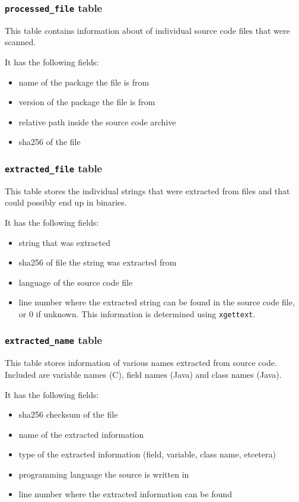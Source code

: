 \documentclass[10pt]{article}
\begin{document}
\subsubsection{\texttt{processed\_file} table}
This table contains information about of individual source code files that were
scanned.

It has the following fields:

\begin{itemize}
\item name of the package the file is from
\item version of the package the file is from
\item relative path inside the source code archive
\item sha256 of the file
\end{itemize}

\subsubsection{\texttt{extracted\_file} table}
This table stores the individual strings that were extracted from files and
that could possibly end up in binaries.

It has the following fields:

\begin{itemize}
\item string that was extracted
\item sha256 of file the string was extracted from
\item language of the source code file
\item line number where the extracted string can be found in the source code
file, or $0$ if unknown. This information is determined using
\texttt{xgettext}.
\end{itemize}

\subsubsection{\texttt{extracted\_name} table}
This table stores information of various names extracted from source code.
Included are variable names (C), field names (Java) and class names (Java).

It has the following fields:

\begin{itemize}
\item sha256 checksum of the file
\item name of the extracted information
\item type of the extracted information (field, variable, class name, etcetera)
\item programming language the source is written in
\item line number where the extracted information can be found
\end{itemize}
\end{document}
